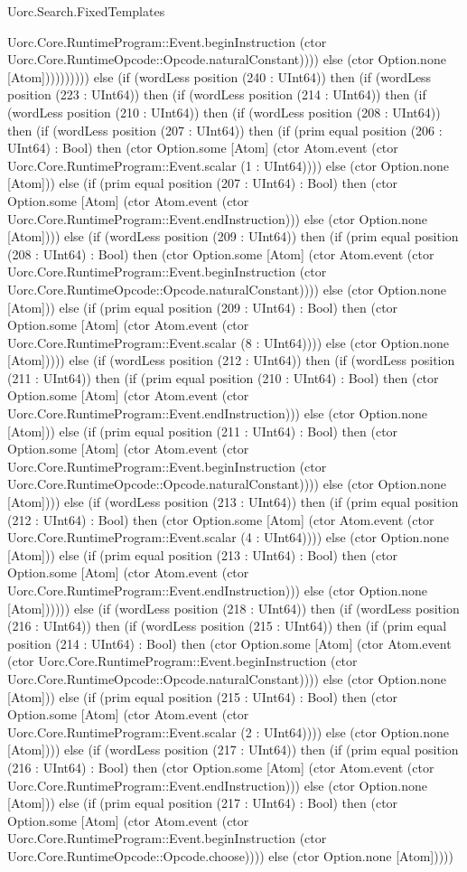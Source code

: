 \begin{lexlean}{Uorc.Search.FixedTemplates}
\begin{semanticmodule}
{Uorc.Core.RuntimeProgram::Event.beginInstruction (ctor Uorc.Core.RuntimeOpcode::Opcode.naturalConstant)))) else (ctor Option.none [Atom]))))))))) else (if (wordLess position (240 : UInt64)) then (if (wordLess position (223 : UInt64)) then (if (wordLess position (214 : UInt64)) then (if (wordLess position (210 : UInt64)) then (if (wordLess position (208 : UInt64)) then (if (wordLess position (207 : UInt64)) then (if (prim equal position (206 : UInt64) : Bool) then (ctor Option.some [Atom] (ctor Atom.event (ctor Uorc.Core.RuntimeProgram::Event.scalar (1 : UInt64)))) else (ctor Option.none [Atom])) else (if (prim equal position (207 : UInt64) : Bool) then (ctor Option.some [Atom] (ctor Atom.event (ctor Uorc.Core.RuntimeProgram::Event.endInstruction))) else (ctor Option.none [Atom]))) else (if (wordLess position (209 : UInt64)) then (if (prim equal position (208 : UInt64) : Bool) then (ctor Option.some [Atom] (ctor Atom.event (ctor Uorc.Core.RuntimeProgram::Event.beginInstruction (ctor Uorc.Core.RuntimeOpcode::Opcode.naturalConstant)))) else (ctor Option.none [Atom])) else (if (prim equal position (209 : UInt64) : Bool) then (ctor Option.some [Atom] (ctor Atom.event (ctor Uorc.Core.RuntimeProgram::Event.scalar (8 : UInt64)))) else (ctor Option.none [Atom])))) else (if (wordLess position (212 : UInt64)) then (if (wordLess position (211 : UInt64)) then (if (prim equal position (210 : UInt64) : Bool) then (ctor Option.some [Atom] (ctor Atom.event (ctor Uorc.Core.RuntimeProgram::Event.endInstruction))) else (ctor Option.none [Atom])) else (if (prim equal position (211 : UInt64) : Bool) then (ctor Option.some [Atom] (ctor Atom.event (ctor Uorc.Core.RuntimeProgram::Event.beginInstruction (ctor Uorc.Core.RuntimeOpcode::Opcode.naturalConstant)))) else (ctor Option.none [Atom]))) else (if (wordLess position (213 : UInt64)) then (if (prim equal position (212 : UInt64) : Bool) then (ctor Option.some [Atom] (ctor Atom.event (ctor Uorc.Core.RuntimeProgram::Event.scalar (4 : UInt64)))) else (ctor Option.none [Atom])) else (if (prim equal position (213 : UInt64) : Bool) then (ctor Option.some [Atom] (ctor Atom.event (ctor Uorc.Core.RuntimeProgram::Event.endInstruction))) else (ctor Option.none [Atom]))))) else (if (wordLess position (218 : UInt64)) then (if (wordLess position (216 : UInt64)) then (if (wordLess position (215 : UInt64)) then (if (prim equal position (214 : UInt64) : Bool) then (ctor Option.some [Atom] (ctor Atom.event (ctor Uorc.Core.RuntimeProgram::Event.beginInstruction (ctor Uorc.Core.RuntimeOpcode::Opcode.naturalConstant)))) else (ctor Option.none [Atom])) else (if (prim equal position (215 : UInt64) : Bool) then (ctor Option.some [Atom] (ctor Atom.event (ctor Uorc.Core.RuntimeProgram::Event.scalar (2 : UInt64)))) else (ctor Option.none [Atom]))) else (if (wordLess position (217 : UInt64)) then (if (prim equal position (216 : UInt64) : Bool) then (ctor Option.some [Atom] (ctor Atom.event (ctor Uorc.Core.RuntimeProgram::Event.endInstruction))) else (ctor Option.none [Atom])) else (if (prim equal position (217 : UInt64) : Bool) then (ctor Option.some [Atom] (ctor Atom.event (ctor Uorc.Core.RuntimeProgram::Event.beginInstruction (ctor Uorc.Core.RuntimeOpcode::Opcode.choose)))) else (ctor Option.none [Atom])))) }
\end{semanticmodule}
\end{lexlean}
